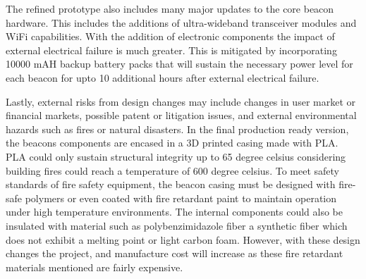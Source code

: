\bigskip
The refined prototype also includes many major updates to the core beacon hardware. This includes the additions of ultra-wideband transceiver modules and WiFi capabilities. With the addition of electronic components the impact of external electrical failure is much greater. This is mitigated by incorporating 10000 mAH backup battery packs that will sustain the necessary power level for each beacon for upto 10 additional hours after external electrical failure.

\bigskip
Lastly, external risks from design changes may include changes in user market or financial markets, possible patent or litigation issues, and external environmental hazards such as fires or natural disasters. In the final production ready version, the beacons components are encased in a 3D printed casing made with PLA. PLA could only sustain structural integrity up to 65 degree celsius considering building fires could reach a temperature of 600 degree celsius. To meet safety standards of fire safety equipment, the beacon casing must be designed with fire-safe polymers or even coated with fire retardant paint to maintain operation under high temperature environments. The internal components could also be insulated with material such as polybenzimidazole fiber a synthetic fiber which does not exhibit a melting point or light carbon foam. However, with these design changes the project, and manufacture cost will increase as these fire retardant materials mentioned are fairly expensive. 
